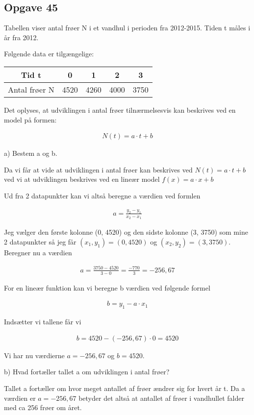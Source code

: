 \subsection{Opgave 45}

Tabellen viser antal frøer N i et vandhul i perioden fra 2012-2015. Tiden t måles i år fra 2012.

Følgende data er tilgængelige:

\begin{tabular}{|c|c|c|c|c|}
    \hline
    Tid t & 0 & 1 & 2 & 3 \\\hline
    Antal frøer N & 4520 & 4260 & 4000 & 3750
\end{tabular}

Det oplyses, at udviklingen i antal frøer tilnærmelsesvis kan beskrives ved en model på formen:

\begin{align*}
    N(t) = a\cdot t + b
\end{align*}

a) Bestem a og b.

\ans

Da vi får at vide at udviklingen i antal frøer kan beskrives ved $N(t) = a\cdot t + b$ ved vi at udviklingen beskrives ved en lineær model $f(x) = a\cdot x + b$

Ud fra 2 datapunkter kan vi altså beregne a værdien ved formlen

\begin{align*}
    a = \frac{y_2 - y_1}{x_2 - x_1}
\end{align*}

Jeg vælger den første kolonne (0, 4520) og den sidste kolonne (3, 3750) som mine 2 datapunkter så jeg får
$(x_1, y_1) = (0, 4520)$ og $(x_2, y_2) = (3, 3750)$. Beregner nu a værdien

\begin{align*}
    a = \frac{3750 - 4520}{3 - 0} = \frac{-770}{3} = -256,67
\end{align*}

For en lineær funktion kan vi beregne b værdien ved følgende formel

\begin{align*}
    b = y_1 - a \cdot x_1
\end{align*}

Indsætter vi tallene får vi

\begin{align*}
    b = 4520 - (-256,67) \cdot 0 = 4520
\end{align*}

Vi har nu værdierne $a = -256,67$ og $b = 4520$.

b) Hvad fortæller tallet a om udviklingen i antal frøer?

\ans

Tallet a fortæller om hvor meget antallet af frøer ændrer sig for hvert år t.
Da a værdien er $a = -256,67$ betyder det altså at antallet af frøer i vandhullet falder med ca 256 frøer om året.
